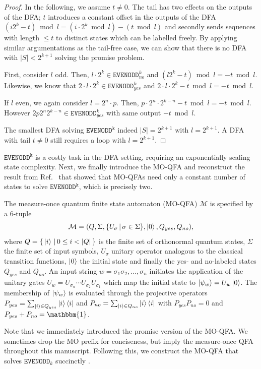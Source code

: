 \documentclass[../main.tex]{subfiles}
\begin{document}
\begin{proof}
In the following, we assume $t \neq 0$. The tail has two effects on the outputs of the DFA; $t$ introduces a constant offset in the outputs of the DFA $(i 2^k - t) \bmod l = (i \cdot 2^k\bmod l) - (t \bmod l)$ and secondly sends sequences with length $\leq t$ to distinct states which can be labelled freely. By applying similar argumentations as the tail-free case, we can show that there is no DFA with $|S| < 2^{k+1}$ solving the promise problem.

First, consider $l$ odd. Then, $l \cdot 2^{k} \in \mathtt{EVENODD}_{no}^{k}$ and  $(l 2^{k} - t) \bmod l = - t \bmod l$. Likewise, we know that $2 \cdot l \cdot 2^{k} \in \mathtt{EVENODD}_{yes}^{k}$ and $2\cdot l \cdot 2^{k} - t \bmod l = - t \bmod l$.

If $l$ even, we again consider $l = 2^{n} \cdot p$. Then, 
$p \cdot 2^n \cdot 2^{k-n} - t \bmod l = - t \bmod l$. However $2 p 2^n 2^{k-n} \in \mathtt{EVENODD}_{yes}^{k}$ with same output $- t \bmod l$.

The smallest DFA solving $\mathtt{EVENODD^k}$ indeed $|S| = 2^{k+1}$ with $l = 2^{k+1}$. A DFA with tail $t \neq 0$ still requires a loop with $l = 2^{k+1}$.
\end{proof}

$\mathtt{EVENODD^k}$ is a costly task in the DFA setting, requiring an exponentially scaling state complexity. Next, we finally introduce the \ac{MO-QFA} and reconstruct the result from Ref.~\cite{ambainis2012superiority} that showed that \acp{MO-QFA} need only a constant number of states to solve $\mathtt{EVENODD^k}$, which is precisely two.

\begin{definition}
The measure-once quantum finite state automaton (MO-QFA) $\mathcal{M}$ is specified by a 6-tuple
\begin{equation}
    \mathcal{M} = (Q, \Sigma, \{U_\sigma \,|\, \sigma \in \Sigma \}, \ket{0}, Q_{yes}, Q_{no}) ,
\end{equation}
where $Q = \{\, \ket{i} \,|\, 0\leq i<|Q|\,\}$ is the finite set of orthonormal quantum states, $\Sigma$ the finite set of input symbols, $U_\sigma$ unitary operator analogous to the classical transition functions, $\ket{0}$ the initial state and finally the yes- and no-labeled states $Q_{yes}$ and $Q_{no}$. An input string $w = \sigma_1 \sigma_2, \dots,\sigma_n$ initiates the application of the unitary gates $U_w = U_{\sigma_n}\cdots U_{\sigma_2} U_{\sigma_1} $ which map the initial state to $\ket{\psi_w} = U_w \ket{0}$. The membership of $\ket{\psi_w}$ is evaluated through the projective operators $P_{yes} = \sum_{\ket{i} \in Q_{yes}} \ket{i} \bra{i}$ and $P_{no} = \sum_{\ket{i} \in Q_{no}} \ket{i} \bra{i}$ with $P_{yes}P_{no} = 0$ and $P_{yes} + P_{no} = \mathbbm{1}$.
\end{definition}
Note that we immediately introduced the promise version of the MO-QFA. We sometimes drop the MO prefix for conciseness, but imply the measure-once QFA throughout this manuscript.
Following this, we construct the \ac{MO-QFA} that solves $\mathtt{EVENODD}_k$ succinctly \cite{ambainis2012superiority,geffert2014classical,rashid2014implications}.
\end{document}
